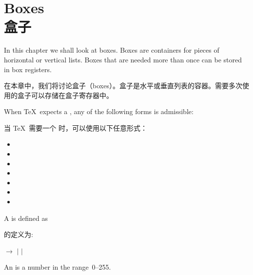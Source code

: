 \documentclass[twoside,letterpaper]{rapport3}
\begin{document}


\setcounter{chapter}{4} 


\section{Boxes\\盒子}

In this chapter we shall look at boxes. Boxes are containers
for pieces of horizontal or vertical lists.
Boxes that are needed more than once can be stored in box registers.

在本章中，我们将讨论盒子（boxes）。盒子是水平或垂直列表的容器。需要多次使用的盒子可以存储在盒子寄存器中。


When \TeX\ expects a , any of the following forms
is admissible:

当 \TeX\ 需要一个  时，可以使用以下任意形式：

\begin{itemize}
\item {}\lb{}\rb
\item {}\lb{}\rb
\item {}\lb{}\rb
\item {}
\item {}
\item {}
\item {}
\end{itemize}
A  is defined as\label{box:spec}

 的定义为:
\begin{disp} $\longrightarrow$ 
\nl\indent$|$   
          $|$  
\end{disp}
An  is a number in the range~0--255.
\end{document}
